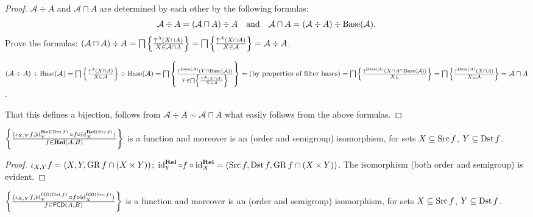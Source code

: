 \begin{proof}
  $\mathcal{A} \div A$ and $\mathcal{A} \sqcap A$ are determined by each other
  by the following formulas:
  \[ \mathcal{A} \div A = (\mathcal{A} \sqcap A) \div A \quad
     \text{and} \quad \mathcal{A} \sqcap A = (\mathcal{A} \div A) \div
     \operatorname{Base} (\mathcal{A}) . \]
  Prove the formulas: $(\mathcal{A} \sqcap A) \div A = \bigsqcap \left\{ \frac{
  \uparrow^A (X \cap A) }{ X \in \mathcal{A} \sqcap A
  }\right\} = \bigsqcap \left\{ \frac{ \uparrow^A (X \cap A) }{
  X \in \mathcal{A} }\right\} = \mathcal{A} \div A$.
  
  $(\mathcal{A} \div A) \div \operatorname{Base} (\mathcal{A}) = \bigsqcap \left\{ \frac{
  \uparrow^A (X \cap A) }{ X \in \mathcal{A} }\right\}
  \div \operatorname{Base} (\mathcal{A}) = \bigsqcap \left\{ \frac{ \uparrow^{\operatorname{Base}
  (\mathcal{A})} (Y \cap \operatorname{Base} (\mathcal{A})) }{
  Y \in \bigsqcap \left\{ \frac{ \uparrow^A (X \cap A) }{
  X \in \mathcal{A} }\right\} }\right\} = \text{(by properties of
  filter bases)} = \bigsqcap \left\{ \frac{ \uparrow^{\operatorname{Base} (\mathcal{A})} (X
  \cap A \cap \operatorname{Base} (\mathcal{A})) }{ X \in
  }\right\} = \bigsqcap \left\{ \frac{ \uparrow^{\operatorname{Base}
  (\mathcal{A})} (X \cap A) }{ X \in \mathcal{A}
  }\right\} = \mathcal{A} \sqcap A$.
  
  That this defines a bijection, follows from $\mathcal{A} \div A \sim
  \mathcal{A} \sqcap A$ what easily follows from the above formulas.
\end{proof}

\begin{prop}
  $\left\{ \frac{ (\iota_{X, Y} f , \operatorname{id}^{\mathbf{Rel}(\operatorname{Dst} f)}_Y \circ f \circ
  \operatorname{id}^{\mathbf{Rel}(\operatorname{Src} f)}_X) }{ f \in
  \mathbf{Rel} (A , B) }\right\}$ is a function and moreover is an
  (order and semigroup) isomorphism, for sets $X \subseteq \operatorname{Src} f$, $Y
  \subseteq \operatorname{Dst} f$.
\end{prop}

\begin{proof}
  $\iota_{X, Y} f = (X , Y , \operatorname{GR} f \cap (X \times Y))$;
  $\operatorname{id}^{\mathbf{Rel}}_Y \circ f \circ
  \operatorname{id}^{\mathbf{Rel}}_X = (\operatorname{Src} f , \operatorname{Dst} f ,
  \operatorname{GR} f \cap (X \times Y))$. The isomorphism (both order and semigroup)
  is evident.
\end{proof}

\begin{prop}
  $\left\{ \frac{ (\iota_{X, Y} f , \operatorname{id}^{\mathsf{FCD}(\operatorname{Dst} f)}_Y
  \circ f \circ \operatorname{id}^{\mathsf{FCD}(\operatorname{Src} f)}_X) }{
  f \in \mathsf{FCD} (A , B) }\right\}$ is a function and moreover is an
  (order and semigroup) isomorphism, for sets $X \subseteq \operatorname{Src} f$, $Y
  \subseteq \operatorname{Dst} f$.
\end{prop}

